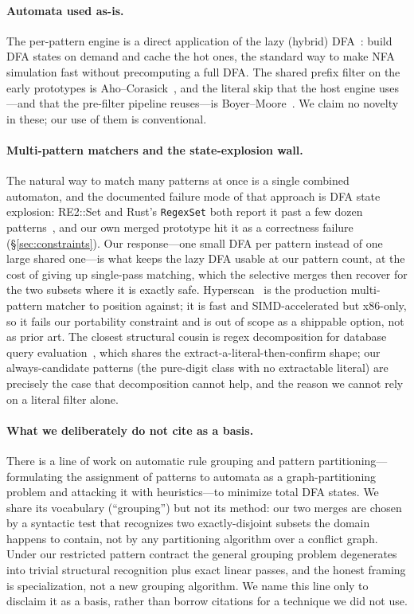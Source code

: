 \documentclass[acmsmall,nonacm,screen]{acmart}
\begin{document}
\paragraph{Automata used as-is.} The per-pattern engine is a direct application of
the lazy (hybrid) DFA~\cite{cox2007regex}: build DFA states on demand and cache the
hot ones, the standard way to make NFA simulation fast without precomputing a full
DFA. The shared prefix filter on the early prototypes is
Aho--Corasick~\cite{aho1975efficient}, and the literal skip that the host engine
uses---and that the pre-filter pipeline reuses---is Boyer--Moore~\cite{boyer1977fast}.
We claim no novelty in these; our use of them is conventional.

\paragraph{Multi-pattern matchers and the state-explosion wall.} The natural way to
match many patterns at once is a single combined automaton, and the documented
failure mode of that approach is DFA state explosion: RE2::Set and Rust's
\texttt{RegexSet} both report it past a few dozen patterns~\cite{re2,rustregex,cox2007regex},
and our own merged prototype hit it as a correctness failure (\S\ref{sec:constraints}).
Our response---one small DFA per pattern instead of one large shared one---is what
keeps the lazy DFA usable at our pattern count, at the cost of giving up
single-pass matching, which the selective merges then recover for the two subsets
where it is exactly safe. Hyperscan~\cite{wang2019hyperscan} is the production
multi-pattern matcher to position against; it is fast and SIMD-accelerated but x86-only,
so it fails our portability constraint and is out of scope as a shippable option,
not as prior art. The closest structural cousin is regex decomposition for database
query evaluation~\cite{patel2023blare}, which shares the
extract-a-literal-then-confirm shape; our always-candidate patterns (the pure-digit
class with no extractable literal) are precisely the case that decomposition cannot
help, and the reason we cannot rely on a literal filter alone.

\paragraph{What we deliberately do not cite as a basis.} There is a line of work on
automatic rule grouping and pattern partitioning---formulating the assignment of
patterns to automata as a graph-partitioning problem and attacking it with
heuristics---to minimize total DFA states. We share its vocabulary (``grouping'')
but not its method: our two merges are chosen by a syntactic test that recognizes
two exactly-disjoint subsets the domain happens to contain, not by any partitioning
algorithm over a conflict graph. Under our restricted pattern contract the general
grouping problem degenerates into trivial structural recognition plus exact linear
passes, and the honest framing is specialization, not a new grouping algorithm. We
name this line only to disclaim it as a basis, rather than borrow citations for a
technique we did not use.
\end{document}
